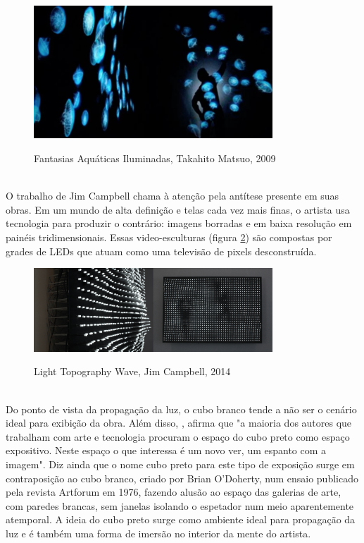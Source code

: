 \begin{figure}[H]
    \centering
    \caption{Fantasias Aquáticas Iluminadas, Takahito Matsuo, 2009}
	\vspace*{0,2cm}
    \includegraphics[width=0.8\textwidth]{./04-figuras/takahito_matsuo}
    \label{fig:takahito_matsuo}
\end{figure}
\vspace*{-0,9cm}
{\raggedright {}}\\

O trabalho de Jim Campbell chama à atenção pela antítese presente em suas obras. Em um mundo de alta definição e telas cada vez mais finas, o artista usa tecnologia para produzir o contrário: imagens borradas e em baixa resolução em painéis tridimensionais. Essas video-esculturas (figura \ref{fig:jim_campbell}) são compostas por grades de LEDs que atuam como uma televisão de pixels desconstruída. 

\begin{figure}[H]
    \centering
    \caption{Light Topography Wave, Jim Campbell, 2014}
	\vspace*{0,2cm}
    \includegraphics[width=0.8\textwidth]{./04-figuras/jim_campbell}
    \label{fig:jim_campbell}
\end{figure}
\vspace*{-0,9cm}
{\raggedright {}}\\

Do ponto de vista da propagação da luz, o cubo branco tende a não ser o cenário ideal para exibição da obra. Além disso, , afirma que "a maioria dos autores que trabalham com arte e tecnologia procuram o espaço do cubo preto como espaço expositivo. Neste espaço o que interessa é um novo ver, um espanto com a imagem". Diz ainda que o nome cubo preto para este tipo de exposição surge em contraposição ao cubo branco, criado por Brian O'Doherty, num ensaio publicado pela revista Artforum em 1976, fazendo alusão ao espaço das galerias de arte, com paredes brancas, sem janelas isolando o espetador num meio aparentemente atemporal. A ideia do cubo preto surge como ambiente ideal para propagação da luz e é também uma forma de imersão no interior da mente do artista.
